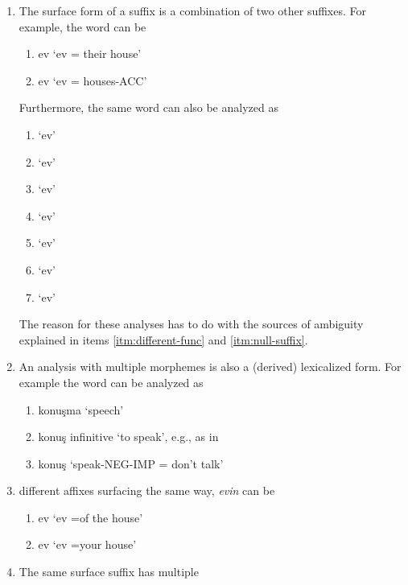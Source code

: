 \documentclass[twocolumn]{article}
\begin{document}
\begin{enumerate}
\item\label{itm:sub-suffix} The surface form of a suffix is a combination of two other suffixes. For example, the word  can be
    \begin{enumerate}
    \item ev `ev = their house'
    \item ev `ev = houses-ACC'
    \end{enumerate}
Furthermore, the same word can also be analyzed as 
    \begin{enumerate}
    \item `ev' 
    \item `ev'  
    \item `ev'
    \item `ev'
    \item `ev'
    \item `ev' 
    \item `ev'
    \end{enumerate}
The reason for these analyses has to do with the sources of ambiguity explained in items \ref{itm:different-func} and \ref{itm:null-suffix}.
\item An analysis with multiple morphemes is also a (derived) lexicalized form. For example the word  can be analyzed as 
    \begin{enumerate}
    \item konuşma `speech'
    \item konuş  infinitive `to speak', e.g., as in 
    \item konuş `speak-NEG-IMP = don't talk'
    \end{enumerate}
\item\label{itm:same-surface} different affixes surfacing the same way, \emph{evin} can be
    \begin{enumerate}
    \item ev `ev =of the house'
    \item ev  `ev =your house'
    \end{enumerate}
\item\label{itm:different-func} The same surface suffix has multiple

\end{enumerate}
\end{document}
